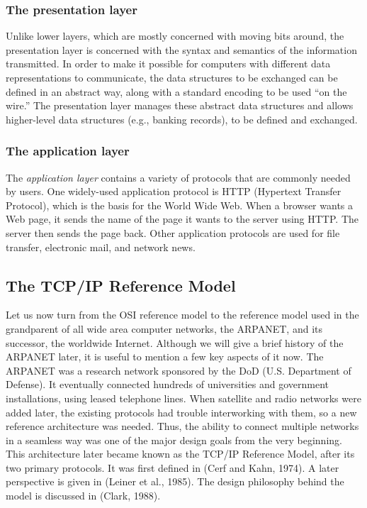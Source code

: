 \subsubsection{The presentation layer}

Unlike lower layers, which are mostly concerned with moving bits around,
the {presentation layer} is concerned with the syntax and semantics of
the information transmitted. In order to make it possible for computers
with different data representations to communicate, the data structures
to be exchanged can be defined in an abstract way, along with a standard
encoding to be used ``on the wire.''
The presentation layer manages these abstract data structures and allows higher-level data structures (e.g., banking records), to be defined and exchanged.


\subsubsection{The application layer}

The \emph{application layer} contains a variety of protocols that are commonly needed by users.
One widely-used application protocol is {HTTP} ({Hypertext Transfer Protocol}), which is the basis for the World Wide Web.
When a browser wants a Web page, it sends the name of the page it wants to the server using HTTP.
The server then sends the page back.
Other application protocols are used for file transfer, electronic mail, and network news.



\subsection{The TCP/IP Reference Model}

Let us now turn from the OSI reference model to the reference model used
in the grandparent of all wide area computer networks, the ARPANET, and
its successor, the worldwide Internet. Although we will give a brief
history of the ARPANET later, it is useful to mention a few key aspects
of it now. The ARPANET was a research network sponsored by the DoD (U.S.
Department of Defense). It eventually connected hundreds of universities
and government installations, using leased telephone lines. When
satellite and radio networks were added later, the existing protocols
had trouble interworking with them, so a new reference architecture was
needed. Thus, the ability to connect multiple networks in a seamless way
was one of the major design goals from the very beginning. This
architecture later became known as the {TCP/IP Reference Model}, after
its two primary protocols. It was first defined in (Cerf and Kahn,
1974). A later perspective is given in (Leiner et al., 1985). The design
philosophy behind the model is discussed in (Clark, 1988).

